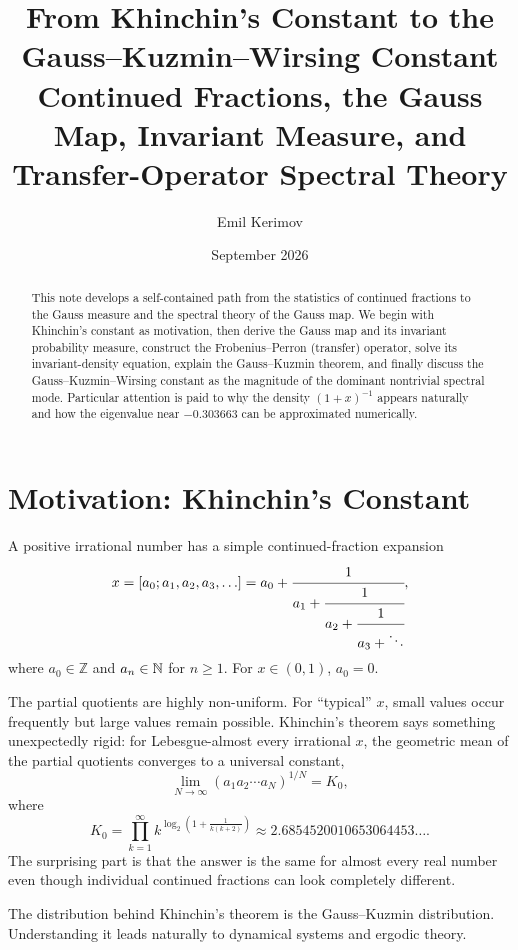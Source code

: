 \documentclass[a4paper]{article}
\title{\textbf{From Khinchin's Constant to the Gauss--Kuzmin--Wirsing Constant}\\[4pt]\large Continued Fractions, the Gauss Map, Invariant Measure, and Transfer-Operator Spectral Theory}
\author{Emil Kerimov}
\date{September 2026}
\begin{document}
\maketitle
\begin{abstract}
This note develops a self-contained path from the statistics of continued fractions to the Gauss measure and the spectral theory of the Gauss map. We begin with Khinchin's constant as motivation, then derive the Gauss map and its invariant probability measure, construct the Frobenius--Perron (transfer) operator, solve its invariant-density equation, explain the Gauss--Kuzmin theorem, and finally discuss the Gauss--Kuzmin--Wirsing constant as the magnitude of the dominant nontrivial spectral mode. Particular attention is paid to why the density $(1+x)^{-1}$ appears naturally and how the eigenvalue near $-0.303663$ can be approximated numerically.
\end{abstract}
\tableofcontents
\newpage

\section{Motivation: Khinchin's Constant}
A positive irrational number has a simple continued-fraction expansion
\begin{equation}
 x=[a_0;a_1,a_2,a_3,\ldots]
 =a_0+\cfrac{1}{a_1+\cfrac{1}{a_2+\cfrac{1}{a_3+\ddots}}},
\end{equation}
where $a_0\in\mathbb Z$ and $a_n\in\mathbb{N}$ for $n\ge1$. For $x\in(0,1)$, $a_0=0$.

The partial quotients are highly non-uniform. For ``typical'' $x$, small values occur frequently but large values remain possible. Khinchin's theorem says something unexpectedly rigid: for Lebesgue-almost every irrational $x$, the geometric mean of the partial quotients converges to a universal constant,
\begin{equation}
 \lim_{N\to\infty}\left(a_1a_2\cdots a_N\right)^{1/N}=K_0,
\end{equation}
where
\begin{equation}
 K_0=\prod_{k=1}^{\infty} k^{\log_2\!\left(1+\frac{1}{k(k+2)}\right)}
 \approx 2.6854520010653064453\ldots.
\end{equation}
The surprising part is that the answer is the same for almost every real number even though individual continued fractions can look completely different.

The distribution behind Khinchin's theorem is the Gauss--Kuzmin distribution. Understanding it leads naturally to dynamical systems and ergodic theory.
\end{document}
